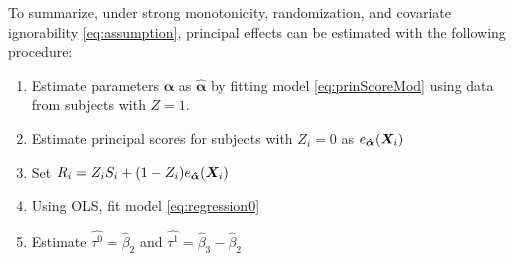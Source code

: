 \documentclass[11pt]{article} %
\begin{document}
To summarize, under strong monotonicity, randomization, and covariate ignorability \eqref{eq:assumption}, principal effects can be estimated with the following procedure:
\begin{enumerate}
\item Estimate parameters $\bm{\alpha}$ as $\bm{\hat{\alpha}}$ by fitting model \eqref{eq:prinScoreMod} using data from subjects with $Z=1$.
\item Estimate principal scores for subjects with $Z_i=0$ as $e_{\bm{\hat{\alpha}}}(\bm{X}_i)$
\item Set $R_i=Z_iS_i+(1-Z_i)e_{\bm{\hat{\alpha}}}(\bm{X}_i)$
\item Using OLS, fit model \eqref{eq:regression0}
\item Estimate $\hat{\tau^0}=\hat{\beta}_2$ and $\hat{\tau^1}=\hat{\beta}_3-\hat{\beta}_2$
\end{enumerate}
\end{document}
